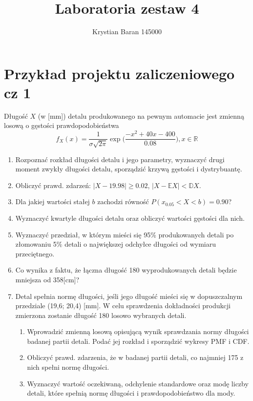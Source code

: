 \documentclass{article}
\author{Krystian Baran 145000}
\title{Laboratoria zestaw 4}
\begin{document}
\maketitle
\newpage

\section{Przykład projektu zaliczeniowego cz 1}
Długość $X$ (w [mm]) detalu produkowanego na pewnym automacie jest zmienną losową o gęstości prawdopodobieństwa
$$f_{X}(x) = \frac{1}{\sigma\sqrt{2\pi}}\exp\Big(\frac{-x^2+40x-400}{0.08}\Big), x\in\mathbb{R}$$

\begin{enumerate}
\item Rozpoznać rozkład długości detalu i jego parametry, wyznaczyć drugi moment zwykły długości detalu, sporządzić krzywą gęstości i dystrybuantę.
\item Obliczyć prawd. zdarzeń: $|X-19.98|\geq 0.02$, $|X-\mathbb{E}X|<\mathbb{D}X$.
\item Dla jakiej wartości stałej $b$ zachodzi równość $P(x_{0.05}<X<b)=0.90$?
\item Wyznaczyć kwartyle długości detalu oraz obliczyć wartości gęstości dla nich.
\item Wyznaczyć przedział, w którym mieści się 95\% produkowanych detali po złomowaniu 5\% detali o największej odchyłce długości od wymiaru przeciętnego.
\item Co wynika z faktu, że łączna długość 180 wyprodukowanych detali będzie mniejsza od 358[cm]?
\item Detal spełnia normę długości, jeśli jego długość mieści się w dopuszczalnym przedziale (19,6; 20,4) [mm]. W celu sprawdzenia dokładności produkcji zmierzona zostanie długość 180 losowo wybranych detali.
\begin{enumerate}
\item Wprowadzić zmienną losową opisującą wynik sprawdzania normy długości badanej partii detali. Podać jej rozkład i sporządzić wykresy PMF i CDF.
\item Obliczyć prawd. zdarzenia, że w badanej partii detali, co najmniej 175 z nich spełni normę długości.
\item Wyznaczyć wartość oczekiwaną, odchylenie standardowe oraz modę liczby detali, które spełnią normę długości i prawdopodobieństwo dla mody.
\end{enumerate}
\end{enumerate}
\end{document}
